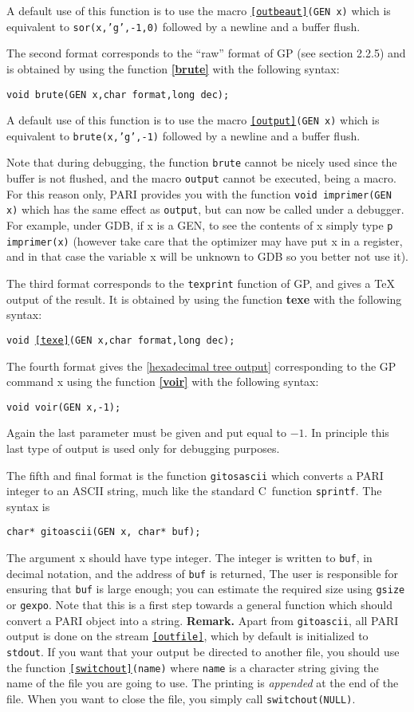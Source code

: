 A default use of this function is to use the macro {\tt \ref{outbeaut}(GEN x)}
which is equivalent to {\tt sor(x,'g',-1,0)} followed by a newline and a
buffer flush.

The second format corresponds to the ``raw'' format of GP (see section 2.2.5)
and is obtained by using the function {\bf \ref{brute}} with the following 
syntax:

{\tt void brute(GEN x,char format,long dec);}

A default use of this function is to use the macro {\tt \ref{output}(GEN x)} 
which is equivalent to {\tt brute(x,'g',-1)} followed by a newline and a 
buffer flush.

Note that during debugging, the function {\tt brute} cannot be nicely used
since the buffer is not flushed, and the macro {\tt output} cannot be 
executed, being a macro. For this reason only, PARI provides you with the
function {\tt void imprimer(GEN x)} which has the same effect as {\tt output},
but can now be called under a debugger. For example, under GDB, if x is a GEN,
to see the contents of x simply type {\tt p imprimer(x)} (however take
care that the optimizer may have put x in a register, and in that case
the variable x will be unknown to GDB so you better not use it).

The third format corresponds to the {\tt texprint} function of GP, and gives
a \TeX{} output of the result. It is obtained by using the function
{\bf texe} with the following syntax:

{\tt void \ref{texe}(GEN x,char format,long dec);}

The fourth format gives the \ref{hexadecimal tree output} corresponding to
the GP command \bs x using the function {\bf \ref{voir}} with the
following syntax:

{\tt void voir(GEN x,-1);}

Again the last parameter must be given and put equal to $-1$. In 
principle this last type of output is used only for debugging purposes.

The fifth and final format is the function {\tt gitosascii} which converts
a PARI integer to an ASCII string, much like the standard C~function 
{\tt sprintf}.  The syntax is

{\tt char* gitoascii(GEN x, char* buf);}

The argument x should have type integer.  The integer is written to
{\tt buf}, in decimal notation, and the address of {\tt buf} is returned,
The user is responsible for ensuring that {\tt buf} is large enough;
you can estimate the required size using {\tt gsize} or {\tt gexpo}.
Note that this is a first step towards a general function which should
convert a PARI object into a string.
\medskip
{\bf Remark.} Apart from {\tt gitoascii}, all PARI output is done on the
stream {\tt \ref{outfile}}, which by default is initialized to 
{\tt stdout}. If you want that your output be directed to another file,
you should use the function {\tt \ref{switchout}(name)}
where {\tt name} is a character string giving the name of the file you
are going to use. The printing is {\it appended\/} at the end of the file.
When you want to close the file, you simply call {\tt switchout(NULL)}.


